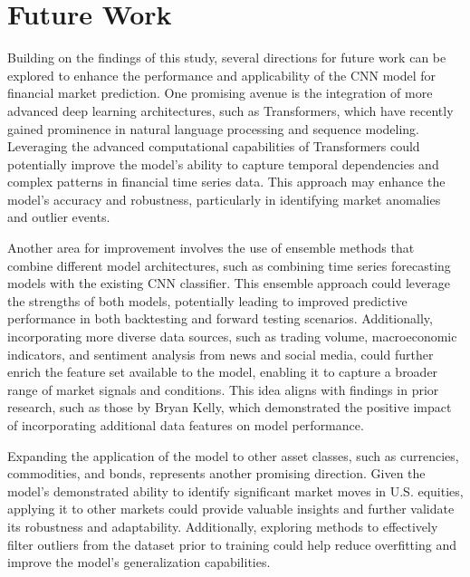 \thesisspacing %

\section{Future Work}

Building on the findings of this study, several directions for future work can be explored to enhance the performance and applicability of the CNN model for financial market prediction. One promising avenue is the integration of more advanced deep learning architectures, such as Transformers, which have recently gained prominence in natural language processing and sequence modeling. Leveraging the advanced computational capabilities of Transformers could potentially improve the model's ability to capture temporal dependencies and complex patterns in financial time series data. This approach may enhance the model's accuracy and robustness, particularly in identifying market anomalies and outlier events.

Another area for improvement involves the use of ensemble methods that combine different model architectures, such as combining time series forecasting models with the existing CNN classifier. This ensemble approach could leverage the strengths of both models, potentially leading to improved predictive performance in both backtesting and forward testing scenarios. Additionally, incorporating more diverse data sources, such as trading volume, macroeconomic indicators, and sentiment analysis from news and social media, could further enrich the feature set available to the model, enabling it to capture a broader range of market signals and conditions. This idea aligns with findings in prior research, such as those by Bryan Kelly, which demonstrated the positive impact of incorporating additional data features on model performance.

Expanding the application of the model to other asset classes, such as currencies, commodities, and bonds, represents another promising direction. Given the model's demonstrated ability to identify significant market moves in U.S. equities, applying it to other markets could provide valuable insights and further validate its robustness and adaptability. Additionally, exploring methods to effectively filter outliers from the dataset prior to training could help reduce overfitting and improve the model’s generalization capabilities.

